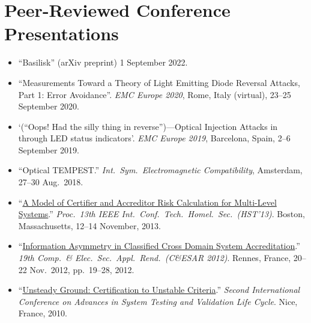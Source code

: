 \vspace{-2mm}
\section*{Peer-Reviewed Conference Presentations}
\vspace{-3mm}

\begin{itemize}
  \item ``Basilisk'' (arXiv preprint) 1 September 2022.\vspace{-2.5mm}

  \item ``Measurements Toward a Theory of Light Emitting Diode Reversal Attacks,
  Part 1: Error Avoidance''. \emph{EMC Europe 2020}, Rome, Italy (virtual),
  23--25 September 2020.\vspace{-2.5mm}

  \item `(``Oops! Had the silly thing in reverse'')---Optical Injection
  Attacks in through LED status indicators'.
  \emph{EMC Europe 2019}, Barcelona, Spain, 2--6 September 2019.\vspace{-2.5mm}

  \item ``Optical TEMPEST.'' \emph{Int.\ Sym.\ Electromagnetic Compatibility},
    Amsterdam, 27--30 Aug.\ 2018.\vspace{-2.5mm}

	\item ``\href{http://ieeexplore.ieee.org/xpls/abs_all.jsp?arnumber=6699004}%
{A Model of Certifier and Accreditor Risk Calculation for Multi-Level
Systems}.'' \emph{Proc.\ 13th IEEE Int.\ Conf.\ Tech.\ Homel.\ Sec.\ (HST'13)}.
Boston, Massachusetts, 12--14 November, 2013.\vspace{-2.5mm}

	\item
``\href{http://cnadocs.com/papers/CESAR2012_information_asymmetry.pdf}%
{Information Asymmetry in Classified Cross Domain System Accreditation}.''
\emph{19th Comp.\ \& Elec.\ Sec.\ Appl.\ Rend.\ (C\&ESAR 2012)}. Rennes,
France, 20--22 Nov.\ 2012, pp.\ 19--28, 2012.\vspace{-2.5mm}

	\item
``\href{http://ieeexplore.ieee.org/xpl/articleDetails.jsp?arnumber=5617171}%
{Unsteady Ground: Certification to Unstable Criteria}.'' \emph{Second
International Conference on Advances in System Testing and Validation Life
Cycle}. Nice, France, 2010. \vspace{2.5mm}


\end{itemize}
